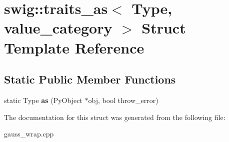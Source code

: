 \hypertarget{structswig_1_1traits__as_3_01_type_00_01value__category_01_4}{\section{swig\-:\-:traits\-\_\-as$<$ Type, value\-\_\-category $>$ Struct Template Reference}
\label{structswig_1_1traits__as_3_01_type_00_01value__category_01_4}
}
\subsection*{Static Public Member Functions}
\begin{DoxyCompactItemize}
\item 
\hypertarget{structswig_1_1traits__as_3_01_type_00_01value__category_01_4_addd7e404759a0808fa9f342f7a0f887b}{static Type {\bfseries as} (Py\-Object $\ast$obj, bool throw\-\_\-error)}\label{structswig_1_1traits__as_3_01_type_00_01value__category_01_4_addd7e404759a0808fa9f342f7a0f887b}

\end{DoxyCompactItemize}


The documentation for this struct was generated from the following file\-:\begin{DoxyCompactItemize}
\item 
gauss\-\_\-wrap.\-cpp\end{DoxyCompactItemize}
